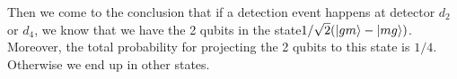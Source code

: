 \documentclass[letterpaper,10pt]{article}
\begin{document}
Then we come to the conclusion that if a detection event happens at detector $d_2$ or $d_4$, we know that we have the 2 qubits in the state$1/\sqrt{2}(\Ket{gm}-\Ket{mg})$. Moreover, the total probability for projecting the 2 qubits to this state is $1/4$. Otherwise we end up in other states. 

\end{document}
